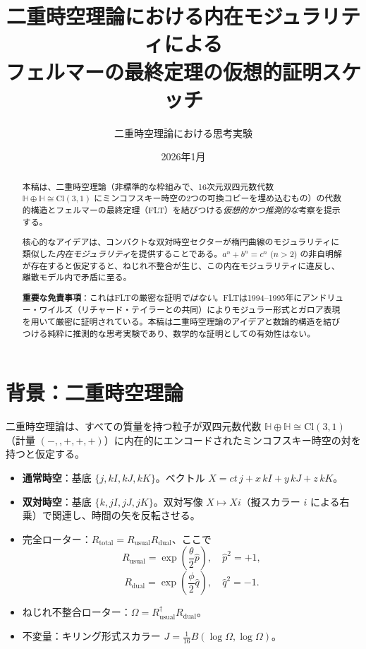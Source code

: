 \documentclass[dvipdfmx,a4paper]{article}
\title{二重時空理論における内在モジュラリティによる\\フェルマーの最終定理の仮想的証明スケッチ}
\author{二重時空理論における思考実験}
\date{2026年1月}
\begin{document}

\maketitle

\begin{abstract}
本稿は、二重時空理論（非標準的な枠組みで、16次元双四元数代数 $\mathbb{H} \oplus \mathbb{H} \cong \mathrm{Cl}(3,1)$ にミンコフスキー時空の2つの可換コピーを埋め込むもの）の代数的構造とフェルマーの最終定理（FLT）を結びつける\emph{仮想的かつ推測的な}考察を提示する。

核心的なアイデアは、コンパクトな双対時空セクターが楕円曲線のモジュラリティに類似した\emph{内在モジュラリティ}を提供することである。$a^n + b^n = c^n$ ($n>2$) の非自明解が存在すると仮定すると、ねじれ不整合が生じ、この内在モジュラリティに違反し、離散モデル内で矛盾に至る。

\textbf{重要な免責事項}：これはFLTの厳密な証明\emph{ではない}。FLTは1994--1995年にアンドリュー・ワイルズ（リチャード・テイラーとの共同）によりモジュラー形式とガロア表現を用いて厳密に証明されている。本稿は二重時空理論のアイデアと数論的構造を結びつける純粋に推測的な思考実験であり、数学的な証明としての有効性はない。
\end{abstract}

\section{背景：二重時空理論}

二重時空理論は、すべての質量を持つ粒子が双四元数代数 $\mathbb{H} \oplus \mathbb{H} \cong \mathrm{Cl}(3,1)$（計量 $(-,,+,+,+)$）に内在的にエンコードされたミンコフスキー時空の対を持つと仮定する。

\begin{itemize}
  \item \textbf{通常時空}：基底 $\{j, kI, kJ, kK\}$。ベクトル $X = ct\, j + x\, kI + y\, kJ + z\, kK$。
  \item \textbf{双対時空}：基底 $\{k, jI, jJ, jK\}$。双対写像 $X \mapsto Xi$（擬スカラー $i$ による右乗）で関連し、時間の矢を反転させる。
  \item 完全ローター：$R_\text{total} = R_\text{usual} R_\text{dual}$、ここで
  \[
  R_\text{usual} = \exp\!\left(\frac{\theta}{2} \hat{p}\right), \quad \hat{p}^2 = +1,
  \]
  \[
  R_\text{dual} = \exp\!\left(\frac{\phi}{2} \hat{q}\right), \quad \hat{q}^2 = -1.
  \]
  \item ねじれ不整合ローター：$\Omega = R_\text{usual}^\dagger R_\text{dual}$。
  \item 不変量：キリング形式スカラー $J = \frac{1}{16} B(\log \Omega, \log \Omega)$。
\end{itemize}
\end{document}
